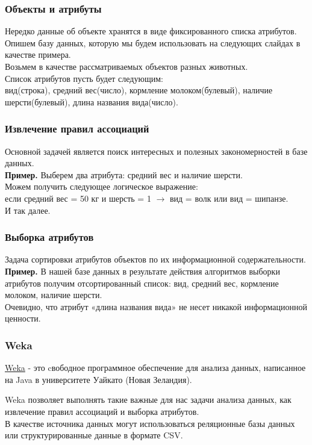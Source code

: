 \documentclass{beamer}
\begin{document}
\begin{frame}
\frametitle{Объекты и атрибуты}
Нередко данные  об объекте хранятся в виде фиксированного списка атрибутов.\\
\vspace{1cm}
Опишем базу данных, которую мы будем использовать на следующих слайдах в качестве примера.\\
\vspace{1cm}
Возьмем в качестве рассматриваемых объектов разных животных.\\
Список атрибутов пусть будет следующим:\\
вид(строка), средний вес(число), кормление молоком(булевый), наличие шерсти(булевый), длина названия вида(число).\\
\end{frame}
\begin{frame}
\frametitle{Извлечение правил ассоциаций}
Основной задачей является поиск интересных и полезных закономерностей в базе данных.\\
\vspace{1cm}
{\bf Пример.}
Выберем два атрибута: средний вес и наличие шерсти.\\
Можем получить следующее логическое выражение:\\
если средний вес = 50 кг и шерсть = 1 $\to$ вид = волк или вид = шипанзе.\\
И так далее.\\
\end{frame}
\begin{frame}
\frametitle{Выборка атрибутов}
Задача сортировки атрибутов объектов по их информационной содержательности.\\
\vspace{1cm}
{\bf Пример.}
В нашей базе данных в результате действия алгоритмов выборки атрибутов получим отсортированный список: вид, средний вес, кормление молоком, наличие шерсти.\\
Очевидно, что атрибут «длина названия вида» не несет никакой информационной ценности.\\
\end{frame}
\begin{frame}
\frametitle{Weka}
\underline{Weka} - это cвободное программное обеспечение для анализа данных, написанное на Java в университете Уайкато (Новая Зеландия).\\

\vspace{1cm}

Weka позволяет выполнять такие важные для нас задачи анализа данных, как извлечение правил ассоциаций и выборка атрибутов.\\
В качестве источника данных могут использоваться реляционные базы данных или структурированные данные в формате CSV.\\
\end{frame}
\end{document}
